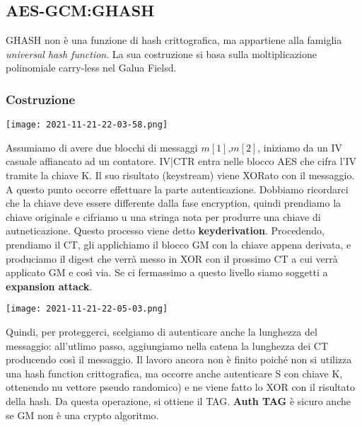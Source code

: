 \documentclass{article}
\theoremstyle{remark}
\begin{document}
\subsection{AES-GCM:GHASH}
GHASH non è una funzione di hash crittografica, ma appartiene alla famiglia \emph{universal hash function}. La sua costruzione si basa
sulla moltiplicazione polinomiale carry-less nel Galua Fielsd.
\subsubsection*{Costruzione}
\begin{center}
	\texttt{[image: 2021-11-21-22-03-58.png]}
\end{center}
Assumiamo di avere due blocchi di messaggi \(m[1]\),\(m[2]\), iniziamo da un IV casuale affiancato ad un contatore. IV|CTR entra nelle blocco
AES che cifra l'IV tramite la chiave K. Il suo risultato (keystream) viene XORato con il messaggio. A questo punto occorre effettuare la parte
autenticazione. Dobbiamo ricordarci che la chiave deve essere differente dalla fase encryption, quindi prendiamo la chiave originale e cifriamo u
una stringa nota per produrre una chiave di autneticazione. Questo processo viene detto \textbf{keyderivation}.\newline
Procedendo, prendiamo il CT, gli applichiamo il blocco GM con la chiave appena derivata, e produciamo il digest che verrà messo in XOR con il
prossimo CT a cui verrà applicato GM e così via. Se ci fermassimo a questo livello siamo soggetti a \textbf{expansion attack}.
\begin{center}
	\texttt{[image: 2021-11-21-22-05-03.png]}
\end{center}
Quindi, per proteggerci, scelgiamo di autenticare anche la lunghezza del messaggio: all'utlimo passo, aggiungiamo nella catena la lunghezza dei CT
producendo così il messaggio. Il lavoro ancora non è finito poiché non si utilizza una hash function crittografica, ma occorre anche autenticare
S con chiave K, ottenendo nu vettore pseudo randomico) e ne viene fatto lo XOR con il risultato della hash. Da questa operazione, si ottiene il TAG.
\textbf{Auth TAG} è sicuro anche se GM non è una crypto algoritmo.
\end{document}
